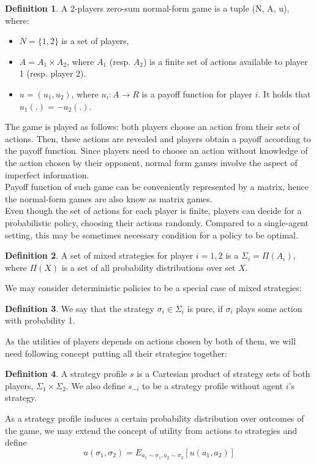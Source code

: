 \documentclass{article}
\theoremstyle{remark}
\theoremstyle{definition}
\newtheorem{definition}{Definition}[section]
\begin{document}
\begin{definition}
	A 2-players zero-sum normal-form game is a tuple (N, A, u), where:
	\begin{itemize}
		\item $N = \{1, 2\}$ is a set of players,
		\item $A = A_1 \times A_2$, where $A_1$ (resp. $A_2$) is a finite set of actions available to player 1 (resp. player 2).
		\item $u = (u_1, u_2)$, where $u_i: A \to R$ is a payoff function for player $i$. It holds that $u_1(.) = - u_2(.)$.
	\end{itemize}
\end{definition}
The game is played as follows: both players choose an action from their sets of actions. Then, these actions are revealed and players obtain a payoff according to the payoff function.  Since players need to choose an action without knowledge of the action chosen by their opponent, normal form games involve the aspect of imperfect information.\\
Payoff function of such game can be conveniently represented by a matrix, hence the normal-form games are also know as matrix games.\\
Even though the set of actions for each player is finite, players can decide for a probabilistic policy, choosing their actions randomly. Compared to a single-agent setting, this may be sometimes necessary condition for a policy to be optimal. 
\begin{definition}
	A set of mixed strategies for player $i = 1,2$ is a $\Sigma_i = \Pi(A_i)$, where $\Pi(X)$ is a set of all probability distributions over set $X$.
\end{definition}
We may consider deterministic policies to be a special case of mixed strategies:
\begin{definition}
	We say that the strategy $\sigma_i \in \Sigma_i$ is pure, if $\sigma_i$ plays some action with probability 1.
\end{definition}
As the utilities of players depends on actions chosen by both of them, we will need following concept putting all their strategies together:
\begin{definition}
	A strategy profile $s$ is a Cartesian product of strategy sets of both players, $\Sigma_1 \times \Sigma_2$. We also define $s_{-i}$ to be a strategy profile without agent $i$'s strategy.
\end{definition}
As a strategy profile induces a certain probability distribution over outcomes of the game, we may extend the concept of utility from actions to strategies and define $$u(\sigma_1, \sigma_2) = E_{a_1 \sim \sigma_{1}, a_2 \sim \sigma_{2}}[u(a_1, a_2)]$$
\end{document}

